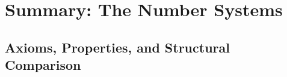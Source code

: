 \chapter{Summary: The Number Systems}
\label{chap:numbers-summary}

 
\section{Axioms, Properties, and Structural Comparison}
\label{sec:numbers-summary-notes}
 

 
